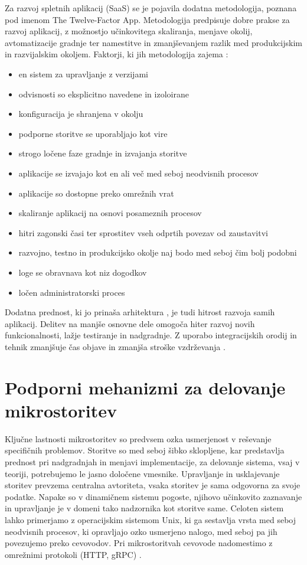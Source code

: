 \documentclass[a4paper, 12pt]{book}
\begin{document}
Za razvoj spletnih aplikacij (SaaS) se je pojavila dodatna metodologija, poznana pod imenom The Twelve-Factor App.
Metodologija predpisuje dobre prakse za razvoj aplikacij, z možnostjo učinkovitega skaliranja, menjave okolij, avtomatizacije gradnje ter namestitve in zmanjševanjem razlik med produkcijskim in razvijalskim okoljem.
Faktorji, ki jih metodologija zajema \cite{12factor}:
\begin{itemize}
	\item en sistem za upravljanje z verzijami
	\item odvisnosti so eksplicitno navedene in izoloirane
	\item konfiguracija je shranjena v okolju
	\item podporne storitve se uporabljajo kot vire
	\item strogo ločene faze gradnje in izvajanja storitve
	\item aplikacije se izvajajo kot en ali več med seboj neodvisnih procesov
	\item aplikacije so dostopne preko omrežnih vrat
	\item skaliranje aplikacij na osnovi posameznih procesov
	\item hitri zagonski časi ter sprostitev vseh odprtih povezav od zaustavitvi
	\item razvojno, testno in produkcijsko okolje naj bodo med seboj čim bolj podobni
	\item loge se obravnava kot niz dogodkov
	\item ločen administratorski proces
\end{itemize}

Dodatna prednost, ki jo prinaša arhitektura , je tudi hitrost razvoja samih aplikacij.
Delitev na manjše osnovne dele omogoča hiter razvoj novih funkcionalnosti, lažje testiranje in nadgradnje.
Z uporabo integracijskih orodij in tehnik zmanjšuje čas objave in zmanjša stroške vzdrževanja \cite{stine2015migrating}.


\section{Podporni mehanizmi za delovanje mikrostoritev}

Ključne lastnosti mikrostoritev so predvsem ozka usmerjenost v reševanje specifičnih problemov.
Storitve so med seboj šibko sklopljene, kar predstavlja prednost pri nadgradnjah in menjavi implementacije, za delovanje sistema, vsaj v teoriji, potrebujemo le jasno določene vmesnike.
Upravljanje in usklajevanje storitev prevzema centralna avtoriteta, vsaka storitev je sama odgovorna za svoje podatke.
Napake so v dinamičnem sistemu pogoste, njihovo učinkovito zaznavanje in upravljanje je v domeni tako nadzornika kot storitve same.
Celoten sistem lahko primerjamo z operacijskim sistemom Unix, ki ga sestavlja vrsta med seboj neodvisnih procesov, ki opravljajo ozko usmerjeno nalogo, med seboj pa jih povezujemo preko cevovodov.
Pri mikrostoritvah cevovode nadomestimo z omrežnimi protokoli (HTTP, gRPC) \cite{microservicesMartin}.
\end{document}
